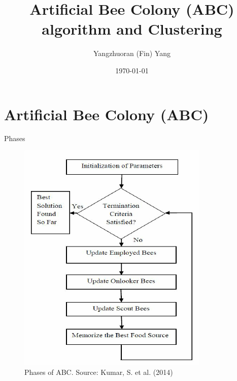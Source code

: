 \documentclass[14pt,ignorenonframetext,compress]{beamer}
\title[]{Artificial Bee Colony (ABC) algorithm and Clustering}
\author[
        Yangzhuoran (Fin) Yang
    ]{Yangzhuoran (Fin) Yang}
\date[
      \today
  ]{
      \today
        }
\begin{document}
  \begin{frame}[plain]
  \titlepage
  \end{frame}



\hypertarget{artificial-bee-colony-abc}{%
\section{Artificial Bee Colony (ABC)}\label{artificial-bee-colony-abc}}

\begin{frame}{Phases}
\protect\hypertarget{phases}{}

\begin{figure}
\includegraphics[width=0.5\linewidth]{ABC} \caption{Phases of ABC. Source: Kumar, S. et al. (2014)}\label{fig:ABC}
\end{figure}

\end{frame}
\end{document}
